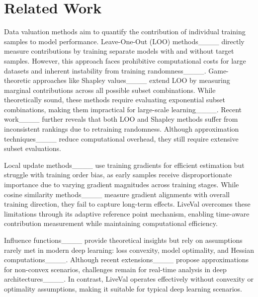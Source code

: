 \section{Related Work}
Data valuation methods aim to quantify the contribution of individual training samples to model performance. Leave-One-Out (LOO) methods____ directly measure contributions by training separate models with and without target samples. However, this approach faces prohibitive computational costs for large datasets and inherent instability from training randomness____.
Game-theoretic approaches like Shapley values____ extend LOO by measuring marginal contributions across all possible subset combinations. While theoretically sound, these methods require evaluating exponential subset combinations, making them impractical for large-scale learning____. Recent work____ further reveals that both LOO and Shapley methods suffer from inconsistent rankings due to retraining randomness. Although approximation techniques____ reduce computational overhead, they still require extensive subset evaluations.

Local update methods____ use training gradients for efficient estimation but struggle with training order bias, as early samples receive disproportionate importance due to varying gradient magnitudes across training stages. While cosine similarity methods____ measure gradient alignments with overall training direction, they fail to capture long-term effects. LiveVal overcomes these limitations through its adaptive reference point mechanism, enabling time-aware contribution measurement while maintaining computational efficiency.

Influence functions____ provide theoretical insights but rely on assumptions rarely met in modern deep learning: loss convexity, model optimality, and Hessian computations____. Although recent extensions____ propose approximations for non-convex scenarios, challenges remain for real-time analysis in deep architectures____. In contrast, LiveVal operates effectively without convexity or optimality assumptions, making it suitable for typical deep learning scenarios.